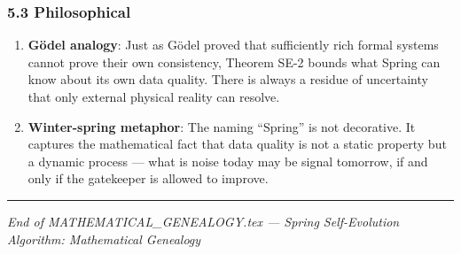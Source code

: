 \documentclass[
  12pt,
]{article}
\providecommand{\tightlist}{%
  \setlength{\itemsep}{0pt}\setlength{\parskip}{0pt}}
\begin{document}
\subsubsection{5.3 Philosophical}\label{philosophical}

\begin{enumerate}
\def\labelenumi{\arabic{enumi}.}
\tightlist
\item \textbf{G\"{o}del analogy}: Just as G\"{o}del proved that sufficiently rich formal systems cannot prove their own consistency, Theorem SE-2 bounds what Spring can know about its own data quality. There is always a residue of uncertainty that only external physical reality can resolve.
\item \textbf{Winter-spring metaphor}: The naming ``Spring'' is not decorative. It captures the mathematical fact that data quality is not a static property but a dynamic process --- what is noise today may be signal tomorrow, if and only if the gatekeeper is allowed to improve.
\end{enumerate}

\begin{center}\rule{0.5\linewidth}{0.5pt}\end{center}

\emph{End of MATHEMATICAL\_GENEALOGY.tex --- Spring Self-Evolution Algorithm: Mathematical Genealogy}
\end{document}

